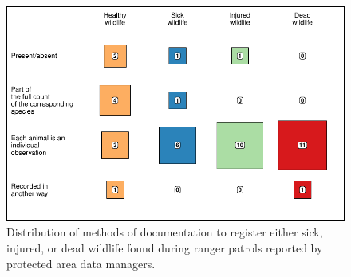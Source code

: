\documentclass[
  letterpaper,
  DIV=11,
  numbers=noendperiod]{scrartcl}
\begin{document}
\begin{figure}[H]

{\centering \includegraphics{Appendix_final_files/figure-pdf/section 2D plot-1.pdf}

}

\caption{Distribution of methods of documentation to register either
sick, injured, or dead wildlife found during ranger patrols reported by
protected area data managers.}

\end{figure}
\end{document}

